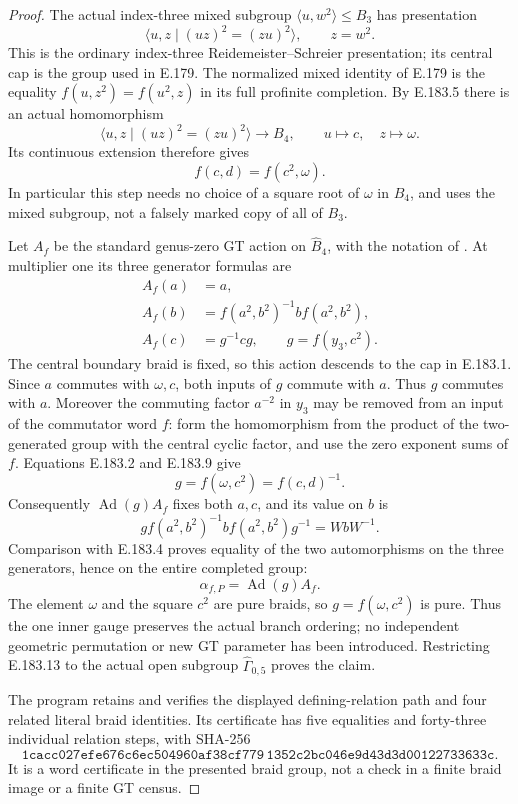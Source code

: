 \begin{proof}
The actual index-three mixed subgroup
\(\langle u,w^2\rangle\leq B_3\) has presentation
\[
             \langle u,z\mid(uz)^2=(zu)^2\rangle,
                    \qquad z=w^2.
\tag{E.183.7}
\]
This is the ordinary index-three Reidemeister--Schreier
presentation; its central cap is the group used in E.179.
The normalized mixed identity of E.179 is the equality
\(f(u,z^2)=f(u^2,z)\) in its full profinite completion.
By E.183.5 there is an actual homomorphism
\[
              \langle u,z\mid(uz)^2=(zu)^2\rangle
                      \longrightarrow B_4,
                       \qquad u\longmapsto c,\quad z\longmapsto\omega.
\tag{E.183.8}
\]
Its continuous extension therefore gives
\[
                         f(c,d)=f(c^2,\omega).
\tag{E.183.9}
\]
In particular this step needs no choice of a square root
of \(\omega\) in \(B_4\), and uses the mixed subgroup,
not a falsely marked copy of all of \(B_3\).

Let \(A_f\) be the standard genus-zero GT action on
\(\widehat B_4\), with the notation of
\citet[equation (1.3), p.657]{LitSchneps2006Automorphisms}.
At multiplier one its three generator formulas are
\[
 \begin{aligned}
 A_f(a)&=a,\\
 A_f(b)&=f(a^2,b^2)^{-1}b f(a^2,b^2),\\
 A_f(c)&=g^{-1}cg,
       \qquad g=f(y_3,c^2).
 \end{aligned}
\tag{E.183.10}
\]
The central boundary braid is fixed, so this action descends
to the cap in E.183.1.
Since \(a\) commutes with \(\omega,c\), both inputs of
\(g\) commute with \(a\).  Thus \(g\) commutes with \(a\).
Moreover the commuting factor \(a^{-2}\) in \(y_3\) may
be removed from an input of the commutator word \(f\):
form the homomorphism from the product of the two-generated
group with the central cyclic factor, and use the zero
exponent sums of \(f\).  Equations E.183.2 and E.183.9 give
\[
                 g=f(\omega,c^2)=f(c,d)^{-1}.
\tag{E.183.11}
\]
Consequently \(\operatorname{Ad}(g)A_f\) fixes both
\(a,c\), and its value on \(b\) is
\[
        g f(a^2,b^2)^{-1}b f(a^2,b^2)g^{-1}
                          =WbW^{-1}.
\tag{E.183.12}
\]
Comparison with E.183.4 proves equality of the two
automorphisms on the three generators, hence on the
entire completed group:
\[
                         \alpha_{f,P}=\operatorname{Ad}(g)A_f.
\tag{E.183.13}
\]
The element \(\omega\) and the square \(c^2\) are pure
braids, so \(g=f(\omega,c^2)\) is pure.  Thus the one
inner gauge preserves the actual branch ordering; no
independent geometric permutation or new GT parameter
has been introduced.  Restricting E.183.13 to the actual
open subgroup \(\widehat\Gamma_{0,5}\) proves the claim.

The program 
retains and verifies the displayed defining-relation path
and four related literal braid identities.  Its certificate
has five equalities and forty-three individual relation
steps, with SHA-256
\[
 \texttt{1cacc027efe676c6ec504960af38cf779}\,
 \texttt{1352c2bc046e9d43d3d00122733633c}.
\]
It is a word certificate in the presented braid group,
not a check in a finite braid image or a finite GT census.
\end{proof}
